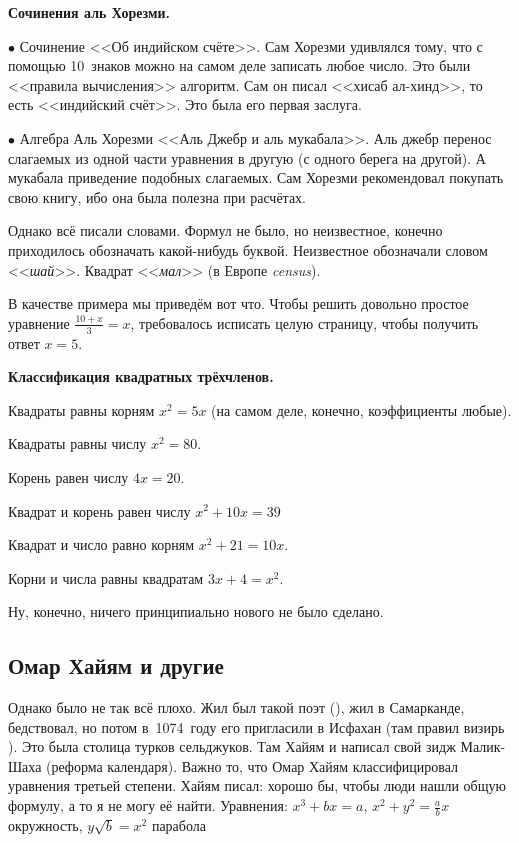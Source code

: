 \documentclass[a4paper,oneside,fleqn,10pt]{article}
\begin{document}
\textbf{Сочинения аль Хорезми.}

$\bullet$ Сочинение <<Об индийском счёте>>. Сам Хорезми удивлялся тому, что с помощью 10~знаков
можно на самом деле записать любое число.  Это были <<правила вычисления>> алгоритм.
Сам он писал <<хисаб ал-хинд>>, то есть <<индийский счёт>>. Это была его первая
заслуга.

$\bullet$ Алгебра Аль Хорезми <<Аль Джебр и аль мукабала>>.
Аль джебр перенос слагаемых из одной части уравнения в другую (с одного берега на другой).
А мукабала приведение подобных слагаемых.
Сам Хорезми рекомендовал покупать свою книгу, ибо она была полезна при расчётах.

Однако всё писали словами. Формул не было, но неизвестное, конечно приходилось обозначать
какой-нибудь буквой. Неизвестное обозначали словом <<\emph{шай}>>.
Квадрат <<\emph{мал}>> (в Европе \emph{census}).

В качестве примера мы приведём вот что. Чтобы решить довольно простое уравнение
$\frac{10+x}{3} = x$, требовалось исписать целую страницу,
чтобы получить ответ $x =5$.

\textbf{Классификация квадратных трёхчленов.}

\begin{items}{-2}
\item Квадраты равны корням $x^2 = 5x$ (на самом деле, конечно, коэффициенты любые).
\item Квадраты равны числу $x^2 = 80$.
\item Корень равен числу $4x = 20$.
\item Квадрат и корень равен числу $x^2 + 10x = 39$
\item Квадрат и число равно корням $x^2 + 21 = 10x$.
\item Корни и числа равны квадратам $3x + 4 = x^2$.
\end{items}

Ну, конечно, ничего принципиально нового не было сделано.

\subsection{Омар Хайям и другие}

Однако было не так всё плохо. Жил был такой поэт  (),
жил в Самарканде, бедствовал, но потом в~1074~году его пригласили в Исфахан (там правил
визирь ). Это была столица турков сельджуков.
Там Хайям и написал свой зидж Малик-Шаха (реформа календаря).
Важно то, что Омар Хайям классифицировал уравнения третьей степени.
Хайям писал: хорошо бы, чтобы люди нашли общую формулу, а то я не могу её найти.
Уравнения: $x^3 + bx = a$, $x^2 + y^2 = \frac{a}{b} x$ окружность,
$y \sqrt b = x^2$ парабола
\end{document}
